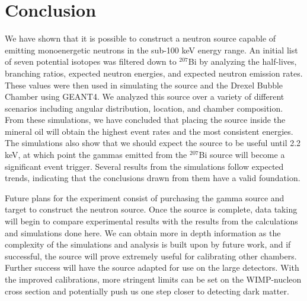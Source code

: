 \documentclass[%
12pt,
twoside,
reprint,
amsmath,amssymb,
aps,
]{article}
\begin{document}
	\section{Conclusion}
	\par We have shown that it is possible to construct a neutron source capable of emitting monoenergetic neutrons in the sub-100 keV energy range. An initial list of seven potential isotopes was filtered down to $^{207}$Bi by analyzing the half-lives, branching ratios, expected neutron energies, and expected neutron emission rates. These values were then used in simulating the source and the Drexel Bubble Chamber using GEANT4. We analyzed this source over a variety of different scenarios including angular distribution, location, and chamber composition. From these simulations, we have concluded that placing the source inside the mineral oil will obtain the highest event rates and the most consistent energies. The simulations also show that we should expect the source to be useful until 2.2 keV, at which point the gammas emitted from the $^{207}$Bi source will become a significant event trigger. Several results from the simulations follow expected trends, indicating that the conclusions drawn from them have a valid foundation.
	\par Future plans for the experiment consist of purchasing the gamma source and target to construct the neutron source. Once the source is complete, data taking will begin to compare experimental results with the results from the calculations and simulations done here. We can obtain more in depth information as the complexity of the simulations and analysis is built upon by future work, and if successful, the source will prove extremely useful for calibrating other chambers. Further success will have the source adapted for use on the large detectors. With the improved calibrations, more stringent limits can be set on the WIMP-nucleon cross section and potentially push us one step closer to detecting dark matter.
	
\end{document}
